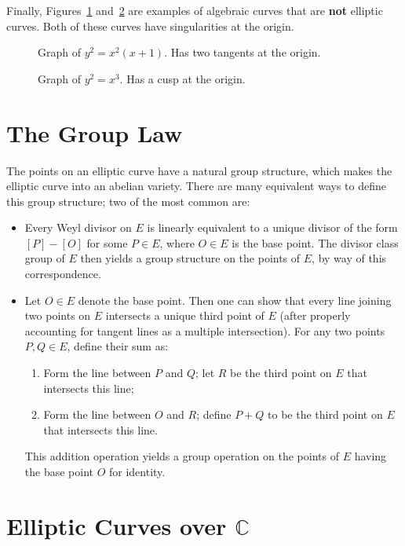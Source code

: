 \documentclass[12pt]{article}
\theoremstyle{definition}
\begin{document}
Finally, Figures~\ref{001} and~\ref{000} are examples of algebraic curves that are {\bf not} elliptic curves. Both of these curves have singularities at the origin.
\begin{figure}
\caption{Graph of $y^2 = x^2 (x+1)$. Has two tangents at the origin.}
\label{001}
\end{figure}

\begin{figure}
\caption{Graph of $y^2 = x^3$. Has a cusp at the origin.}
\label{000}
\end{figure}

\section{The Group Law}

The points on an elliptic curve have a natural group structure, which makes the elliptic curve into an abelian variety. There are many equivalent ways to define this group structure; two of the most common are:
\begin{itemize}
\item Every Weyl divisor on $E$ is linearly equivalent to a unique divisor of the form $[P] - [O]$ for some $P \in E$, where $O \in E$ is the base point. The divisor class group of $E$ then yields a group structure on the points of $E$, by way of this correspondence.
\item Let $O \in E$ denote the base point. Then one can show that every line joining two points on $E$ intersects a unique third point of $E$ (after properly accounting for tangent lines as a multiple intersection). For any two points $P,Q \in E$, define their sum as:
\begin{enumerate}
\item Form the line between $P$ and $Q$; let $R$ be the third point on $E$ that intersects this line;
\item Form the line between $O$ and $R$; define $P+Q$ to be the third point on $E$ that intersects this line.
\end{enumerate}
This addition operation yields a group operation on the points of $E$ having the base point $O$ for identity.
\end{itemize}

\section{Elliptic Curves over $\mathbb{C}$}
\end{document}

